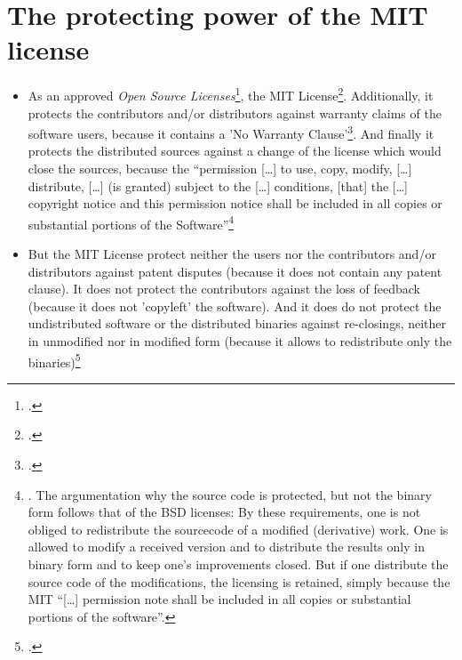\section{The protecting power of the MIT license}
\begin{itemize}
  \item As an approved \emph{Open Source Licenses}\footcite[cf.][\nopage
  wp]{OSI2012b}, the MIT License\footcite[MIT has to be resolved as
  \enquote{Massachusetts Institute of Technology (cf.][\nopage wp).]{wpMitLic2011a}}
  protects the user against the loss of the right to use, to modify and/or to
  distribute the received copy of the source code or the
  binary\footcite[cf.][\nopage wp §1ff]{OSI2012a}. Additionally, it protects the
  contributors and/or distributors against warranty claims of the software
  users, because it contains a 'No Warranty Clause'\footcite[cf.][\nopage
  wp]{MitLicense2012a}. And finally it protects the distributed sources against
  a change of the license which would close the sources, because the
  \enquote{permission [\ldots] to use, copy, modify, [\ldots] distribute,
  [\ldots] (is granted) subject to the [\ldots] conditions, [that] the [\ldots]
  copyright notice and this permission notice shall be included in all copies or
  substantial portions of the Software}\footnote{\cite[cf.][\nopage
  wp]{MitLicense2012a}. The argumentation why the source code is protected, but
  not the binary form follows that of the BSD licenses: By these requirements,
  one is not obliged to redistribute the sourcecode of a modified (derivative)
  work. One is allowed to modify a received version and to distribute the
  results only in binary form and to keep one's improvements closed. But if one
  distribute the source code of the modifications, the licensing is retained,
  simply because the MIT \enquote{[\ldots] permission note shall be included in
  all copies or substantial portions of the software}.}
 
  \item But the MIT License protect neither the users nor the contributors
  and/or distributors against patent disputes (because it does not contain any
  patent clause). It does not protect the contributors against the loss of
  feedback (because it does not 'copyleft' the software). And it does do not
  protect the undistributed software or the distributed binaries against
  re-closings, neither in unmodified nor in modified form (because it allows to
  redistribute only the binaries)\footcite[cf.][\nopage wp]{MitLicense2012a}
  
\end{itemize}

